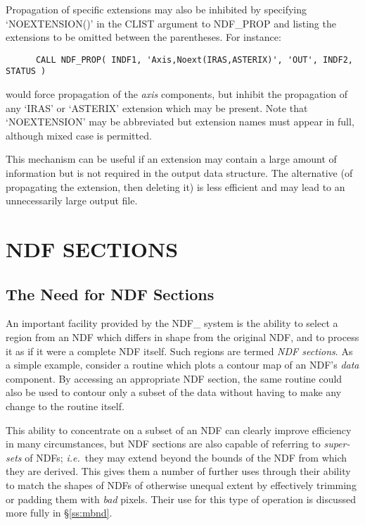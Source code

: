 \documentclass[twoside,11pt]{article}
\newcommand{\htmlref}[2]{#1}
\newcommand{\xlabel}[1]{}
\newcommand{\st}[1]{{\em{#1}}}
\begin{document}
Propagation of specific extensions may also be inhibited by specifying
`NOEXTENSION()' in the CLIST argument to \htmlref{NDF\_PROP}{NDF_PROP} and listing the
extensions to be omitted between the parentheses. 
For instance:

\small
\begin{verbatim}
      CALL NDF_PROP( INDF1, 'Axis,Noext(IRAS,ASTERIX)', 'OUT', INDF2, STATUS )
\end{verbatim}
\normalsize

would force propagation of the \st{axis\/} components, but inhibit the
propagation of any `IRAS' or `ASTERIX' extension which may be present. 
Note that `NOEXTENSION' may be abbreviated but extension names must appear 
in full, although mixed case is permitted.

This mechanism can be useful if an extension may contain a large amount of
information but is not required in the output data structure. 
The alternative (of propagating the extension, then deleting it) is less
efficient and may lead to an unnecessarily large output file. 


\section{\xlabel{ndf_sections}\label{ss:ndfsections}NDF SECTIONS}

\subsection{\xlabel{the_need_for_ndf_sections}The Need for NDF Sections}

An important facility provided by the NDF\_ system is the ability to select
a region from an NDF which differs in shape from the original NDF, and to
process it as if it were a complete NDF itself. 
Such regions are termed \st{NDF sections}.
As a simple example, consider a routine which plots a contour map of an
NDF's \st{data\/} component. 
By accessing an appropriate NDF section, the same routine could also be used
to contour only a subset of the data without having to make any change to
the routine itself.

This ability to concentrate on a subset of an NDF can clearly improve
efficiency in many circumstances, but NDF sections are also capable of
referring to \st{super-sets\/} of NDFs; \st{i.e.}\ they may extend beyond the
bounds of the NDF from which they are derived. 
This gives them a number of further uses through their ability to match the
shapes of NDFs of otherwise unequal extent by effectively trimming or
padding them with \st{bad\/} pixels. 
Their use for this type of operation is discussed more fully in 
\S\ref{ss:mbnd}.
\end{document}
